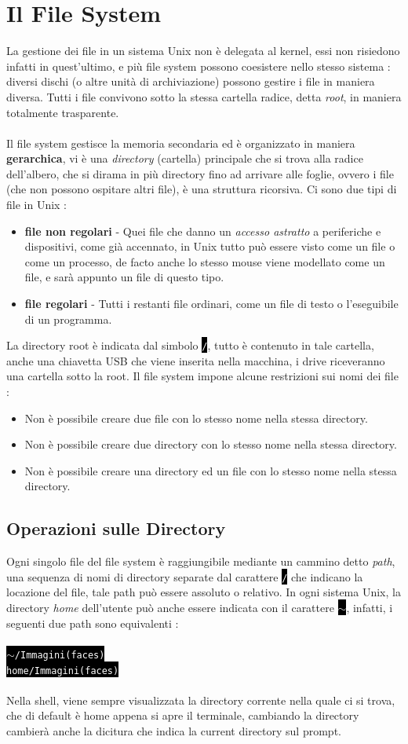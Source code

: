 \documentclass[12pt, letterpaper]{article}
\newcommand{\shelll}[1]{\colorbox{black}{\textcolor{white}{\texttt{#1}}}}
\newcommand{\acc}{\\\hphantom{}\\}
\begin{document}
\section{Il File System}
La gestione dei file in un sistema Unix non è delegata al kernel, essi non risiedono infatti in quest'ultimo, e più file system 
possono coesistere nello stesso sistema : diversi dischi (o altre unità di archiviazione) possono gestire i file in maniera
 diversa. Tutti i file convivono sotto la stessa cartella radice, detta \textit{root}, in maniera totalmente trasparente.\acc 
 Il file system gestisce la memoria secondaria ed è organizzato in maniera \textbf{gerarchica}, vi è una \textit{directory}
  (cartella) principale che si trova alla radice dell'albero, che si dirama in più directory fino ad arrivare alle foglie, 
  ovvero i file (che non possono ospitare altri file), è una struttura ricorsiva. Ci sono due tipi di file in Unix : \begin{itemize}
    \item \textbf{file non regolari} - Quei file che danno un \textit{accesso astratto} a periferiche e dispositivi, come già
    accennato, in Unix tutto può essere visto come un file o come un processo, de facto anche lo stesso mouse viene modellato come 
    un file, e sarà appunto un file di questo tipo.
    \item \textbf{file regolari} - Tutti i restanti file ordinari, come un file di testo o l'eseguibile di un programma.
  \end{itemize}
La directory root è indicata dal simbolo \shelll{/}, tutto è contenuto in tale cartella, anche una chiavetta USB che viene 
inserita nella macchina, i drive riceveranno una cartella sotto la root. Il file system impone alcune restrizioni sui nomi dei file : \begin{itemize}
    \item Non è possibile creare due file con lo stesso nome nella stessa directory.
    \item Non è possibile creare due directory con lo stesso nome nella stessa directory.
    \item Non è possibile creare una directory ed un file con lo stesso nome nella stessa directory.
\end{itemize}
\subsection{Operazioni sulle Directory}
Ogni singolo file del file system è raggiungibile mediante un cammino detto \textit{path}, una sequenza di nomi di directory 
separate dal carattere \shelll{/} che indicano la locazione del file, tale path può essere assoluto o relativo. In ogni sistema 
Unix, la directory \textit{home} dell'utente può anche essere indicata con il carattere \shelll{\(\sim\)}, infatti, i seguenti 
due path sono equivalenti : \acc 
\shelll{\(\sim\)/Immagini(faces)}\\
\shelll{home/Immagini(faces)}\acc
Nella shell, viene sempre visualizzata la directory corrente nella quale ci si trova, che di default è home appena si apre il 
terminale, cambiando la directory cambierà anche la dicitura che indica la current directory sul prompt.
\end{document}
